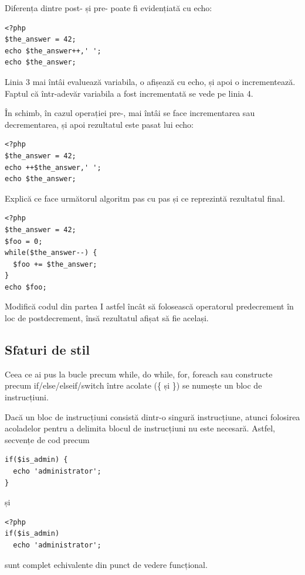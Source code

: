 Diferența dintre post- și pre- poate fi evidențiată cu echo:
\begin{lstlisting}
<?php
$the_answer = 42;
echo $the_answer++,' ';
echo $the_answer;
\end{lstlisting}
Linia 3 mai întâi evaluează variabila, o afișează cu echo, și apoi
o incrementează. Faptul că într-adevăr variabila a fost incrementată
se vede pe linia 4.

În schimb, în cazul operației {\glqq}pre-{\grqq}, mai întâi se face incrementarea sau decrementarea,
și apoi rezultatul este pasat lui echo:
\begin{lstlisting}
<?php
$the_answer = 42;
echo ++$the_answer,' ';
echo $the_answer;
\end{lstlisting}

\begin{Exercise}[title={Decrementarea într-o buclă},difficulty=1]
\ExePart
Explică ce face următorul algoritm pas cu pas și ce reprezintă rezultatul final.
\begin{lstlisting}
<?php
$the_answer = 42;
$foo = 0;
while($the_answer--) {
  $foo += $the_answer;
}
echo $foo;
\end{lstlisting}
\ExePart
Modifică codul din partea I astfel încât să folosească operatorul predecrement în loc de postdecrement,
însă rezultatul afișat să fie același.
\end{Exercise}

\subsection{Sfaturi de stil}
Ceea ce ai pus la bucle precum while, do while, for, foreach sau constructe
precum if/else/elseif/switch între acolate (\{ și \}) se numește un bloc de instrucțiuni.

Dacă un bloc de instrucțiuni consistă dintr-o singură instrucțiune, atunci folosirea
acoladelor pentru a delimita blocul de instrucțiuni nu este necesară. Astfel, secvențe
de cod precum
\begin{lstlisting}
if($is_admin) {
  echo 'administrator';
}
\end{lstlisting}
și
\begin{lstlisting}
<?php
if($is_admin)
  echo 'administrator';
\end{lstlisting}
sunt complet echivalente din punct de vedere funcțional.


